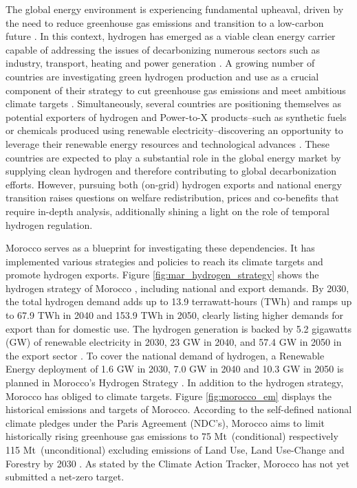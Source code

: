 The global energy environment is experiencing fundamental upheaval, driven by the need to reduce greenhouse gas emissions and transition to a low-carbon future \cite{Davis2018, Victoria2020}. 
In this context, hydrogen has emerged as a viable clean energy carrier capable of addressing the issues of decarbonizing numerous sectors such as industry, transport, heating and power generation \cite{IEA2021,Ueckerdt2021, Gailani2024, Kovac2021, Azadnia2023}. 
A growing number of countries are investigating green hydrogen production and use as a crucial component of their strategy to cut greenhouse gas emissions and meet ambitious climate targets \cite{IEA2021, Zeyen2023}.
Simultaneously, several countries are positioning themselves as potential exporters of hydrogen and Power-to-X products--such as synthetic fuels or chemicals produced using renewable electricity--discovering an opportunity to leverage their renewable energy resources and technological advances \cite{InternationalEnergyAgency2024}.
These countries are expected to play a substantial role in the global energy market by supplying clean hydrogen and therefore contributing to global decarbonization efforts\cite{InternationalEnergyAgency2024}. However, pursuing both (on-grid) hydrogen exports and national energy transition raises questions on welfare redistribution, prices and co-benefits that require in-depth analysis, additionally shining a light on the role of temporal hydrogen regulation.

Morocco serves as a blueprint for investigating these dependencies. It has implemented various strategies and policies to reach its climate targets and promote hydrogen exports. Figure \ref{fig:mar_hydrogen_strategy} shows the hydrogen strategy of Morocco \cite{MarHyStrat2021}, including national and export demands. By 2030, the total hydrogen demand adds up to 13.9 terrawatt-hours (TWh) and ramps up to 67.9 TWh in 2040 and 153.9 TWh in 2050, clearly listing higher demands for export than for domestic use. The hydrogen generation is backed by 5.2 gigawatts (GW) of renewable electricity in 2030, 23 GW in 2040, and 57.4 GW in 2050 in the export sector \cite{MarHyStrat2021}. To cover the national demand of hydrogen, a Renewable Energy deployment of 1.6 GW in 2030, 7.0 GW in 2040 and 10.3 GW in 2050 is planned in Morocco's Hydrogen Strategy \cite{MarHyStrat2021}. In addition to the hydrogen strategy, Morocco has obliged to climate targets. Figure \ref{fig:morocco_em} displays the historical emissions and targets of Morocco.
According to the self-defined national climate pledges under the Paris Agreement (NDC's), Morocco aims to limit historically rising greenhouse gas emissions to 75 Mt\coe\ (conditional) respectively 115 Mt\coe\ (unconditional) excluding emissions of Land Use, Land Use-Change and Forestry by 2030 \cite{CAT2021}. 
As stated by the Climate Action Tracker\cite{CAT2021}, Morocco has not yet submitted a net-zero target. 

